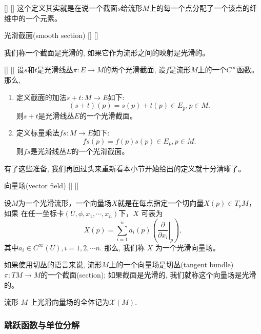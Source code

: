 \documentclass[UTF8]{ctexart}
\begin{document}
    \begin{rmk}
        []
        {}
        []
        []
        这个定义其实就是在说一个截面$s$给流形$M$上的每一个点分配了一个该点的纤维中的一个元素。
    \end{rmk}

    \begin{dfn}
        []
        {光滑截面(smooth section)}
        []
        []

        我们称一个截面是光滑的, 如果它作为流形之间的映射是光滑的。
    \end{dfn}

    \begin{ppt}
        []
        {}
        []
        []
        设$s$和$t$是光滑线丛$\pi : E \rightarrow M$的两个光滑截面, 设$f$是流形$M$上的一个$C^{\infty}$函数。那么,
        \begin{enumerate}
            \item 定义截面的加法$s + t : M \rightarrow E$如下:
            \[
                (s + t)(p) = s(p) + t(p) \in E_p, p \in M .
            \]
            则$s + t$是光滑线丛$E$的一个光滑截面。
            \item 定义标量乘法$f s : M \rightarrow E$如下:
            \[
                fs(p) = f(p)s(p) \in E_p, p \in M.
            \]
            则$f s$是光滑线丛$E$的一个光滑截面。
        \end{enumerate}
    \end{ppt}
    有了这些准备, 我们再回过头来重新看本小节开始给出的定义就十分清晰了。

    \begin{dfn}
        []
        {向量场(vector field)}
        []
        []

        设$M$为一个光滑流形，一个向量场$X$就是在每点指定一个切向量$X(p) \in T_pM$，如果
        在任一坐标卡$(U,\phi,x_1,\cdots,x_n)$下，$X$ 可表为
    \[
    X(p)=\sum_{i=1}^{n} a_{i}(p)\left(\left.\frac{\partial}{\partial x_{i}}\right|_{p}\right),
    \]
    其中$a_i \in C^{\infty}(U) , i = 1,2, \cdots n$. 那么, 我们称 $X$ 为一个光滑向量场。
    
    如果使用切丛的语言来说, 流形$M$上的一个向量场是切丛(tangent bundle) $\pi : TM \rightarrow M$的一个截面(section); 如果截面是光滑的, 我们就称这个向量场是光滑的。
    
    流形 $M$ 上光滑向量场的全体记为$\mathcal{X}(M)$.
    \end{dfn}


    \subsubsection{跳跃函数与单位分解}
    
\end{document}
